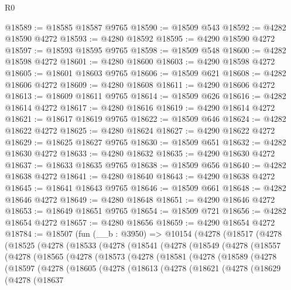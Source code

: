 \begin{lexlean}{R0}
\begin{coremodule}
@18589 := @18585 @18587 @9765
@18590 := @18509 @543
@18592 := @4282 @18590 @4272
@18593 := @4280 @18592
@18595 := @4290 @18590 @4272
@18597 := @18593 @18595 @9765
@18598 := @18509 @548
@18600 := @4282 @18598 @4272
@18601 := @4280 @18600
@18603 := @4290 @18598 @4272
@18605 := @18601 @18603 @9765
@18606 := @18509 @621
@18608 := @4282 @18606 @4272
@18609 := @4280 @18608
@18611 := @4290 @18606 @4272
@18613 := @18609 @18611 @9765
@18614 := @18509 @626
@18616 := @4282 @18614 @4272
@18617 := @4280 @18616
@18619 := @4290 @18614 @4272
@18621 := @18617 @18619 @9765
@18622 := @18509 @646
@18624 := @4282 @18622 @4272
@18625 := @4280 @18624
@18627 := @4290 @18622 @4272
@18629 := @18625 @18627 @9765
@18630 := @18509 @651
@18632 := @4282 @18630 @4272
@18633 := @4280 @18632
@18635 := @4290 @18630 @4272
@18637 := @18633 @18635 @9765
@18638 := @18509 @656
@18640 := @4282 @18638 @4272
@18641 := @4280 @18640
@18643 := @4290 @18638 @4272
@18645 := @18641 @18643 @9765
@18646 := @18509 @661
@18648 := @4282 @18646 @4272
@18649 := @4280 @18648
@18651 := @4290 @18646 @4272
@18653 := @18649 @18651 @9765
@18654 := @18509 @721
@18656 := @4282 @18654 @4272
@18657 := @4280 @18656
@18659 := @4290 @18654 @4272
@18784 := @18507
    (fun (__b : @3950) =>
    @10154
      (@4278
        (@18517
          (@4278
            (@18525
              (@4278
                (@18533
                  (@4278
                    (@18541
                      (@4278
                        (@18549
                          (@4278
                            (@18557
                              (@4278
                                (@18565
                                  (@4278
                                    (@18573
                                      (@4278
                                        (@18581
                                          (@4278
                                            (@18589
                                              (@4278
                                                (@18597
                                                  (@4278
                                                    (@18605
                                                      (@4278
                                                        (@18613
                                                          (@4278
                                                            (@18621
                                                              (@4278
                                                                (@18629
                                                                  (@4278
                                                                    (@18637

\end{coremodule}
\end{lexlean}
